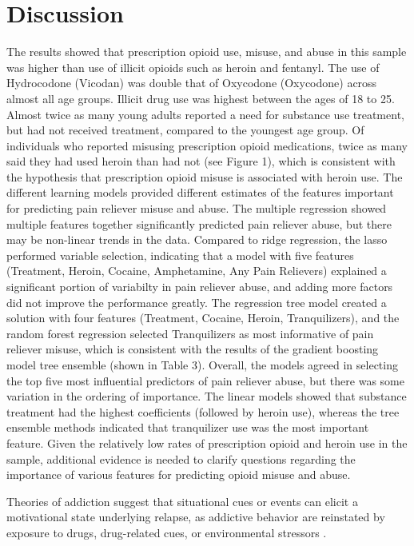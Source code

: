 \documentclass[sigconf]{acmart}
\begin{document}
\section{Discussion}

The results showed that prescription opioid use, misuse, and abuse in this 
sample was higher than use of illicit opioids such as heroin and fentanyl. 
The use of Hydrocodone (Vicodan) was double that of Oxycodone (Oxycodone) 
across almost all age groups. Illicit drug use was highest between the ages 
of 18 to 25. Almost twice as many young adults reported a need for substance 
use treatment, but had not received treatment, compared to the youngest age 
group. Of individuals who reported misusing prescription opioid medications, 
twice as many said they had used heroin than had not (see Figure 1), which is 
consistent with the hypothesis that prescription opioid misuse is associated 
with heroin use. The different learning models provided different estimates 
of the features important for predicting pain reliever misuse and abuse. 
The multiple regression showed multiple features together significantly 
predicted pain reliever abuse, but there may be non-linear trends in the data.
Compared to ridge regression, the lasso performed variable selection, 
indicating that a model with five features (Treatment, Heroin, Cocaine, 
Amphetamine, Any Pain Relievers) explained a significant portion of
variabilty in pain reliever abuse, and adding more factors did not improve
the performance greatly. The regression tree model created a solution
with four features (Treatment, Cocaine, Heroin, Tranquilizers), and the
random forest regression selected Tranquilizers as most informative of
pain reliever misuse, which is consistent with the results of the gradient
boosting model tree ensemble (shown in Table 3). Overall, the models 
agreed in selecting the top five most influential predictors of pain
reliever abuse, but there was some variation in the ordering of importance. 
The linear models showed that substance treatment had the highest
coefficients (followed by heroin use), whereas the tree ensemble methods
indicated that tranquilizer use was the most important feature. Given the 
relatively low rates of prescription opioid and heroin use in the sample, 
additional evidence is needed to clarify questions regarding the importance
of various features for predicting opioid misuse and abuse. 
 

Theories of addiction suggest that situational cues or events can elicit a 
motivational state underlying relapse, as addictive behavior are reinstated by 
exposure to drugs, drug-related cues, or environmental stressors \cite{shaham03}. 
\end{document}
